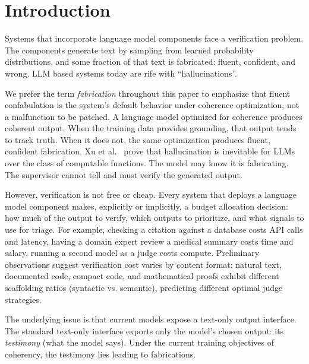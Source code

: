 \balance
\section{Introduction}\label{sec:intro}

Systems that incorporate language model components face a verification problem.
The components generate text by sampling from learned probability distributions,
and some fraction of that text is fabricated: fluent, confident, and wrong.
LLM based systems today are rife with ``hallucinations''.


We prefer the term \emph{fabrication} throughout this paper to emphasize that
fluent confabulation is the system's default behavior under coherence
optimization, not a malfunction to be patched. A language model optimized for
coherence produces coherent output. When the training data provides grounding,
that output tends to track truth. When it does not, the same optimization
produces fluent, confident fabrication. Xu et
al.~\cite{xu2024hallucination} prove that hallucination is
inevitable for LLMs over the class of computable functions.
The model may know it is fabricating. The supervisor cannot tell
and must verify the generated output.

However, verification is not free or cheap. Every system that
deploys a language model component makes, explicitly or implicitly, a budget
allocation decision: how much of the output to verify, which outputs to
prioritize, and what signals to use for triage.
For example, checking a citation against a database costs API
calls and latency, having a domain expert review a medical summary costs time
and salary, running a second model as a judge costs compute.
Preliminary observations suggest verification cost varies by content format:
natural text, documented code, compact code, and mathematical proofs exhibit
different scaffolding ratios (syntactic vs. semantic), predicting different optimal judge strategies.

The underlying issue is that current models
expose a text-only output interface. The standard
text-only interface exports only the model's chosen output: its
\emph{testimony} (what the model says).
Under the current training objectives of coherency, the testimony
lies leading to fabrications.

